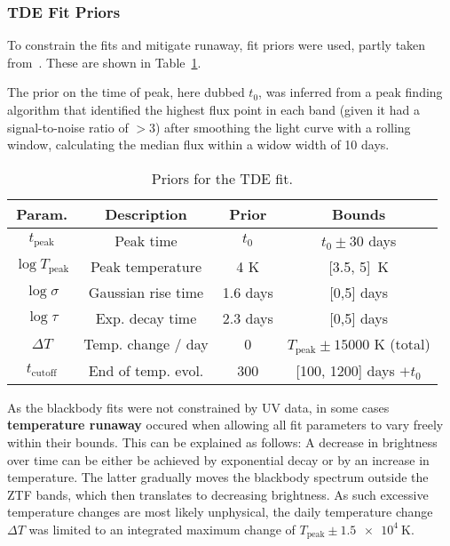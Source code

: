 \subsubsection{TDE Fit Priors}
To constrain the fits and mitigate runaway, fit priors were used, partly taken from~\cite{Velzen2021a}. These are shown in Table~\ref{tab:tde_fit_priors}.

The prior on the time of peak, here dubbed $t_0$, was inferred from a peak finding algorithm that identified the highest flux point in each band (given it had a signal-to-noise ratio of $>3$) after smoothing the light curve with a rolling window, calculating the median flux within a widow width of 10 days.

\begin{table}[h]
    \begin{center}
        \begin{tabular}{c|c|c|c}
            Param.               & Description        & Prior    & Bounds                              \\
            \hline
            $t_\text{peak}$      & Peak time          & $t_0$    & $t­_0 \pm 30$ days                  \\
            $\log T_\text{peak}$ & Peak temperature   & 4 K      & [3.5, 5]~\unit{\K}                  \\
            $\log \sigma$        & Gaussian rise time & 1.6 days & [0,5] days                          \\
            $\log \tau$          & Exp. decay time    & 2.3 days & [0,5] days                          \\
            $\Delta T$           & Temp. change / day & 0        & $T_\text{peak} \pm 15000$ K (total) \\
            $t_\text{cutoff}$    & End of temp. evol. & 300      & [100, 1200] days $+t_0$
        \end{tabular}
    \end{center}
    \caption[TDE Fit priors]{Priors for the TDE fit.}\label{tab:tde_fit_priors}
\end{table}

As the blackbody fits were not constrained by UV data, in some cases \textbf{temperature runaway} occured when allowing all fit parameters to vary freely within their bounds. This can be explained as follows: A decrease in brightness over time can be either be achieved by exponential decay or by an increase in temperature. The latter gradually moves the blackbody spectrum outside the ZTF bands, which then translates to decreasing brightness. As such excessive temperature changes are most likely unphysical, the daily temperature change $\Delta T$ was limited to an integrated maximum change of $T_\text{peak} \pm \SI{1.5e4}{\K}$.

